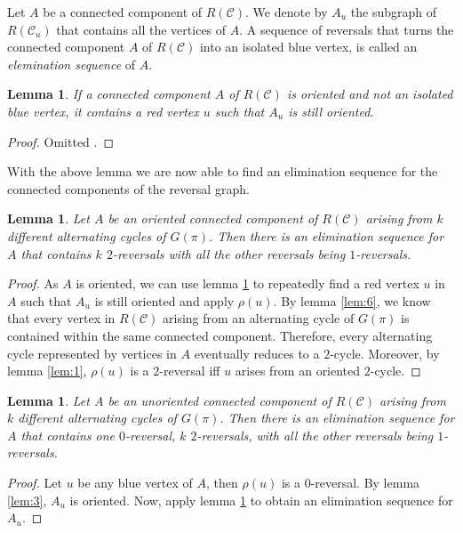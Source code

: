 \documentclass[11pt,DIV=11]{scrartcl}
\newtheorem{lemma}[theorem]{Lemma}
\theoremstyle{definition}
\theoremstyle{remark}
\begin{document}
Let $A$ be a connected component of $R(\mathcal{C})$. We denote by $A_u$ the subgraph of $R(\mathcal{C}_u)$ that contains all the vertices of $A$. A sequence of reversals that turns the connected component $A$ of $R(\mathcal{C})$ into an isolated blue vertex, is called an \textit{elemination sequence} of $A$.

\begin{lemma}
\label{lem:7}
If a connected component $A$ of $R(\mathcal{C})$ is oriented and not an isolated blue vertex, it contains a red vertex $u$ such that $A_u$ is still oriented.
\end{lemma}

\begin{proof}
Omitted \cite{Christie1998}.
\end{proof}

With the above lemma we are now able to find an elimination sequence for the connected components of the reversal graph.

\begin{lemma}
\label{lem:8}
Let $A$ be an oriented connected component of $R(\mathcal{C})$ arising from $k$ different alternating cycles of $G(\pi)$. Then there is an elimination sequence for $A$ that contains $k$ $2$-reversals with all the other reversals being $1$-reversals.
\end{lemma}

\begin{proof}
As $A$ is oriented, we can use lemma \ref{lem:7} to repeatedly find a red vertex $u$ in $A$ such that $A_u$ is still oriented and apply $\rho(u)$.
By lemma \ref{lem:6}, we know that every vertex in $R(\mathcal{C})$ arising from an alternating cycle of $G(\pi)$ is contained within the same connected component. Therefore, every alternating cycle represented by vertices in $A$ eventually reduces to a $2$-cycle. Moreover, by lemma \ref{lem:1}, $\rho(u)$ is a $2$-reversal iff $u$ arises from an oriented $2$-cycle.
\end{proof}

\begin{lemma}
\label{lem:9}
Let $A$ be an unoriented connected component of $R(\mathcal{C})$ arising from $k$ different alternating cycles of $G(\pi)$. Then there is an elimination sequence for $A$ that contains one $0$-reversal, $k$ $2$-reversals, with all the other reversals being $1$-reversals.
\end{lemma}

\begin{proof}
Let $u$ be any blue vertex of $A$, then $\rho(u)$ is a $0$-reversal. By lemma \ref{lem:3}, $A_u$ is oriented.
Now, apply lemma \ref{lem:8} to obtain an elimination sequence for $A_u$.
\end{proof}
\end{document}
